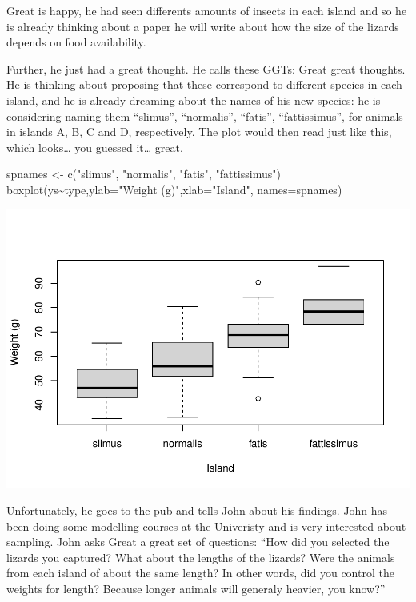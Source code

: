\documentclass[
]{book}
\newenvironment{Shaded}{\begin{snugshade}}{\end{snugshade}}
\newcommand{\AttributeTok}[1]{\textcolor[rgb]{0.77,0.63,0.00}{#1}}
\newcommand{\FunctionTok}[1]{\textcolor[rgb]{0.00,0.00,0.00}{#1}}
\newcommand{\NormalTok}[1]{#1}
\newcommand{\OtherTok}[1]{\textcolor[rgb]{0.56,0.35,0.01}{#1}}
\newcommand{\SpecialCharTok}[1]{\textcolor[rgb]{0.00,0.00,0.00}{#1}}
\newcommand{\StringTok}[1]{\textcolor[rgb]{0.31,0.60,0.02}{#1}}
\begin{document}
Great is happy, he had seen differents amounts of insects in each island and so he is already thinking about a paper he will write about how the size of the lizards depends on food availability.

Further, he just had a great thought. He calls these GGTs: Great great thoughts. He is thinking about proposing that these correspond to different species in each island, and he is already dreaming about the names of his new species: he is considering naming them ``slimus'', ``normalis'', ``fatis'', ``fattissimus'', for animals in islands A, B, C and D, respectively. The plot would then read just like this, which looks\ldots{} you guessed it\ldots{} great.

\begin{Shaded}
\begin{Highlighting}[]
\NormalTok{spnames }\OtherTok{\textless{}{-}} \FunctionTok{c}\NormalTok{(}\StringTok{"slimus"}\NormalTok{, }\StringTok{"normalis"}\NormalTok{, }\StringTok{"fatis"}\NormalTok{, }\StringTok{"fattissimus"}\NormalTok{)}
\FunctionTok{boxplot}\NormalTok{(ys}\SpecialCharTok{\textasciitilde{}}\NormalTok{type,}\AttributeTok{ylab=}\StringTok{"Weight (g)"}\NormalTok{,}\AttributeTok{xlab=}\StringTok{"Island"}\NormalTok{,}
\AttributeTok{names=}\NormalTok{spnames)}
\end{Highlighting}
\end{Shaded}

\includegraphics{ECOMODbook_files/figure-latex/a10.5-1.pdf}

Unfortunately, he goes to the pub and tells John about his findings. John has been doing some modelling courses at the Univeristy and is very interested about sampling.
John asks Great a great set of questions: ``How did you selected the lizards you captured? What about the lengths of the lizards? Were the animals from each island of about the same length? In other words, did you control the weights for length? Because longer animals will generaly heavier, you know?''
\end{document}
